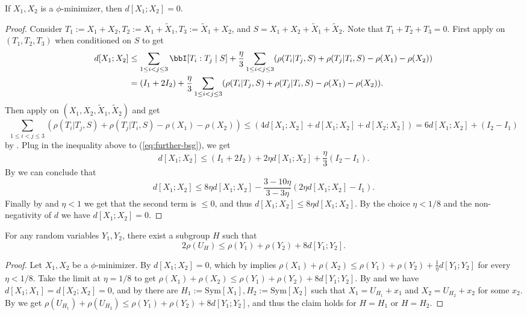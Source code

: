 \begin{proposition}\label{phi-minimizer-zero-distance}\leanok  If $X_1,X_2$ is a $\phi$-minimizer, then $d[X_1;X_2] = 0$.
\end{proposition}

\begin{proof}\leanok
Consider $T_1:=X_1+X_2,T_2:=X_1+\tilde X_1, T_3:=\tilde X_1 + X_2$, and $S=X_1+X_2+\tilde X_1 + \tilde X_2$. Note that $T_1+T_2+T_3=0$.
First apply  on $(T_1,T_2,T_3)$ when conditioned on $S$ to get
\begin{align}  \label{eq:further-bsg}
d[X_1;X_2] &\leq  \sum_{1 \leq i<j \leq 3} \bbI[T_i:T_j\mid S] + \frac{\eta}{3}   \sum_{1 \leq i<j \leq 3} (\rho(T_i|T_j,S) + \rho(T_j|T_i,S) -\rho(X_1)-\rho(X_2))\nonumber\\
&= (I_1+2I_2) + \frac{\eta}{3}   \sum_{1 \leq i<j \leq 3} (\rho(T_i|T_j,S) + \rho(T_j|T_i,S) -\rho(X_1)-\rho(X_2)).
\end{align}
Then apply  on $(X_1,X_2,\tilde X_1,\tilde X_2)$ and get
$$\sum_{1 \leq i<j \leq 3} (\rho(T_i|T_j,S) + \rho(T_j|T_i,S) -  \rho(X_1)-\rho(X_2))\le (4d[X_1;X_2]+d[X_1;X_2]+d[X_2;X_2])= 6 d[X_1;X_2]+(I_2-I_1)$$
by . Plug in the inequality above to (\ref{eq:further-bsg}), we get
$$d[X_1;X_2] \le (I_1+2I_2)+2\eta d[X_1;X_2]+\frac{\eta}{3}(I_2-I_1).$$
By  we can conclude that
$$d[X_1;X_2] \le 8\eta d[X_1;X_2]-\frac{3-10\eta}{3-3\eta} (2\eta d[X_1;X_2]-I_1).$$
Finally by  and $\eta<1$ we get that the second term is $\le 0$, and thus $d[X_1;X_2] \le 8\eta d[X_1;X_2]$. By the choice $\eta<1/8$ and the non-negativity of $d$ we have $d[X_1;X_2]=0$.
\end{proof}


\begin{proposition} \label{pfr-rho}\leanok For any random variables $Y_1,Y_2$, there exist a subgroup $H$ such that
  $$ 2\rho(U_H) \leq \rho(Y_1) + \rho(Y_2) + 8 d[Y_1;Y_2].$$
\end{proposition}

\begin{proof}\leanok
  
Let $X_1,X_2$ be a $\phi$-minimizer. By  $d[X_1;X_2]=0$, which by  implies $\rho(X_1)+\rho(X_2)\le \rho(Y_1) + \rho(Y_2) + \frac{1}{\eta} d[Y_1;Y_2]$ for every $\eta<1/8$. Take the limit at $\eta=1/8$ to get $\rho(X_1)+\rho(X_2)\le \rho(Y_1) + \rho(Y_2) + 8 d[Y_1;Y_2]$.
By  and  we have $d[X_1;X_1]=d[X_2;X_2]=0$, and by  there are $H_1:=\mathrm{Sym}[X_1],H_2:=\mathrm{Sym}[X_2]$ such that $X_1=U_{H_1}+x_1$ and $X_2=U_{H_2}+x_2$ for some $x_2$.
By  we get $\rho(U_{H_1})+\rho(U_{H_2})\le \rho(Y_1) + \rho(Y_2) + 8 d[Y_1;Y_2]$, and thus the claim holds for $H=H_1$ or $H=H_2$.
\end{proof}

